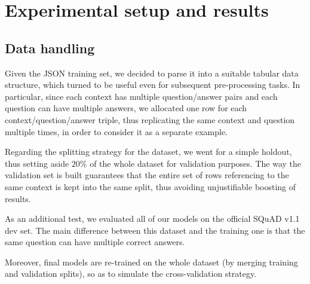 \documentclass[a4paper,10pt]{report}
\begin{document}
\chapter{Experimental setup and results}\label{chap:experiments}

\section{Data handling}\label{sec:data-handling}
Given the JSON training set, we decided to parse it into a suitable tabular data structure, which turned to be useful even for subsequent pre-processing tasks. In particular, since each context has multiple question/answer pairs and each question can have multiple answers, we allocated one row for each context/question/answer triple, thus replicating the same context and question multiple times, in order to consider it as a separate example.

Regarding the splitting strategy for the dataset, we went for a simple holdout, thus setting aside $20\%$ of the whole dataset for validation purposes. The way the validation set is built guarantees that the entire set of rows referencing to the same context is kept into the same split, thus avoiding unjustifiable boosting of results.

As an additional test, we evaluated all of our models on the official SQuAD v1.1 dev set. The main difference between this dataset and the training one is that the same question can have multiple correct answers.

Moreover, final models are re-trained on the whole dataset (by merging training and validation splits), so as to simulate the cross-validation strategy.
\end{document}
